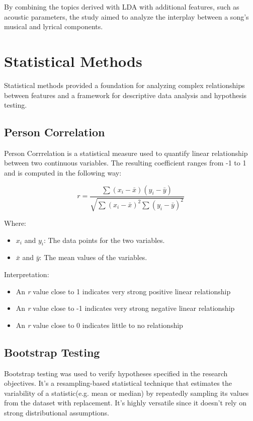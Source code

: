 By combining the topics derived with LDA with additional features, such as
acoustic parameters, the study aimed to analyze the interplay between a song's
musical and lyrical components.


\section{Statistical Methods}
\label{sec:statisticalmethods}

Statistical methods provided a foundation for analyzing complex relationships
between features and a framework for descriptive data analysis and hypothesis
testing.

\subsection{Person Correlation}

Person Corrrelation is a statistical measure used to quantify linear
relationship between two continuous variables. The resulting coefficient ranges
from -1 to 1 and is computed in the following way:

\[
r = \frac{\sum{(x_i - \bar{x})(y_i - \bar{y})}}{\sqrt{\sum{(x_i - \bar{x})^2} \sum{(y_i - \bar{y})^2}}}
\]

Where:
\begin{itemize}
    \item \( x_i \) and \( y_i \): The data points for the two variables.
    \item \( \bar{x} \) and \( \bar{y} \): The mean values of the variables.
\end{itemize}

Interpretation:
\begin{itemize}
  \item An \textit{r} value close to 1 indicates very strong positive linear relationship
  \item An \textit{r} value close to -1 indicates very strong negative linear relationship
  \item An \textit{r} value close to 0 indicates little to no relationship
\end{itemize}



\subsection{Bootstrap Testing}

Bootstrap testing was used to verify hypotheses specified in the research
objectives. It's a resampling-based statistical technique that estimates the
variability of a statistic(e.g. mean or median)  by
repeatedly sampling its values from the dataset with replacement. It's highly
versatile since it doesn't rely on strong distributional assumptions.


